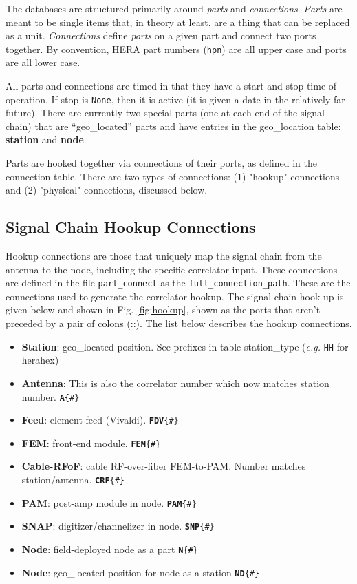 \documentclass{article}
\begin{document}
The databases are structured primarily around {\em parts} and {\em connections}.  {\em Parts} are meant to be single items that, in theory at least, are a thing that can be replaced as a unit.  
{\em Connections} define {\em ports} on a given part and connect two ports together.  By convention, HERA part numbers ({\tt hpn}) are all upper case and ports are all lower case.

All parts and connections are timed in that they have a start and stop time of operation.  If stop is {\tt None}, then it is active (it is given a date in the relatively far future).  There are currently two special parts (one at each end of the signal chain) that are ``geo\_located'' parts and have entries in the geo\_location table: {\bf station} and {\bf node}.

Parts are hooked together via connections of their ports, as defined in the connection table.   There are two types of connections:  (1) "hookup" connections and (2) "physical" connections, discussed below.

\subsection{Signal Chain Hookup Connections}
Hookup connections are those that uniquely map the signal chain from the antenna to the node, including the specific correlator input.  These connections are defined in the file {\tt part\_connect} as the {\tt full\_connection\_path}.  These are the connections used to generate the correlator hookup.
The signal chain hook-up is given below and shown in Fig. \ref{fig:hookup}, shown as the ports that aren't preceded by a pair of colons (::).  The list below describes the hookup connections.
\begin{itemize}\setlength\itemsep{-.3em}
	\item {\bf Station}: geo\_located position.  See prefixes in table station\_type ({\em e.g.} {\tt HH} for herahex)
	\item {\bf Antenna}:  This is also the correlator number which now matches station number.  {\tt{\bf A}\{\#\}}
	\item {\bf Feed}:  element feed (Vivaldi).  {\tt {\bf FDV}\{\#\}}
	\item {\bf FEM}:  front-end module. {\tt {\bf FEM}\{\#\}}
	\item {\bf Cable-RFoF}:  cable RF-over-fiber FEM-to-PAM.  Number matches station/antenna. {\tt {\bf CRF}\{\#\}}
	\item {\bf PAM}:  post-amp module in node. {\tt {\bf PAM}\{\#\}}
	\item {\bf SNAP}:  digitizer/channelizer in node. {\tt {\bf SNP}\{\#\}}
	\item {\bf Node}: field-deployed node as a part {\tt {\bf N}\{\#\}}
	\item {\bf Node}:  geo\_located position for node as a station {\tt {\bf ND}\{\#\}}
\end{itemize}
\end{document}
